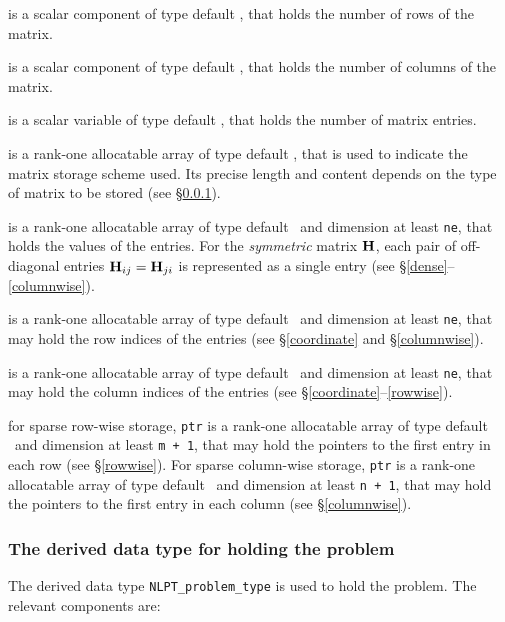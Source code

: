 \documentclass{galahad}
\begin{document}
\begin{description}

 is a scalar component of type default \integer, 
that holds the number of rows of the matrix.

 is a scalar component of type default \integer, 
that holds the number of columns of the matrix. 
 
 is a scalar variable of type default \integer, that
holds the number of matrix entries.

 is a rank-one allocatable array of type default \character, that
is used to indicate the matrix storage scheme used. Its precise length and
content depends on the type of matrix to be stored (see \S\ref{typeprob}).

 is a rank-one allocatable array of type default \realdp\,
and dimension at least {\tt ne}, that holds the values of the entries.
For the {\em symmetric} matrix ${\mathbf{H}}$, each pair of off-diagonal entries
${\mathbf{H}}_{ij} = {\mathbf{H}}_{ji}$ is represented
as a single entry (see \S\ref{dense}--\ref{columnwise}).

 is a rank-one allocatable array of type default \integer\ 
and dimension at least {\tt ne}, that may hold the row indices of the entries 
(see \S\ref{coordinate} and \S\ref{columnwise}).

 is a rank-one allocatable array of type default \integer\ 
and dimension at least {\tt ne}, that may hold the column indices of the entries
(see \S\ref{coordinate}--\ref{rowwise}).

 for sparse row-wise storage, {\tt ptr} is a rank-one
allocatable array of type default \integer\ and dimension at least
{\tt m + 1}, that may hold the pointers to the first entry in each row
(see \S\ref{rowwise}).  For sparse column-wise storage, {\tt ptr}
is a rank-one allocatable array of type default \integer\ and
dimension at least {\tt n + 1}, that may hold the pointers to the
first entry in each column (see \S\ref{columnwise}).

\end{description}


\subsubsection{The derived data type for holding the problem}\label{typeprob}
The derived data type {\tt NLPT\_problem\_type} is used to hold the
problem. The relevant components are:
\end{document}
